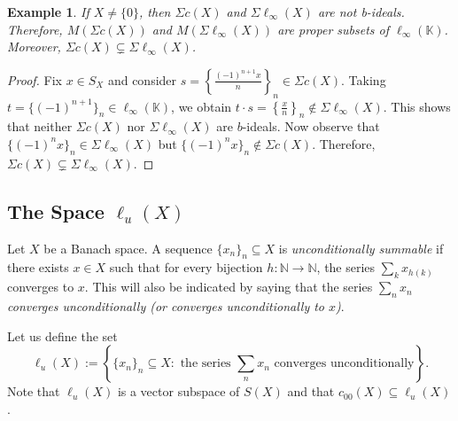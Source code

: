 \documentclass[14pt, a4paper]{article}  %
\providecommand{\pare}[1]{\left( #1\right) }
\newcommand{\K}{\mathbb{K}}
\newcommand{\N}{\mathbb{N}}
\newtheorem{example}{Example}[section]  %
\begin{document}
		\begin{example}\label{d333}
		If $X \neq \{0\}$, then  $\Sigma c\pare{X}$ and $\Sigma \ell_{\infty}\pare{X}$ are not b-ideals. Therefore,  $M(\Sigma c (X))$ and $M(\Sigma \ell_\infty (X))$ are proper subsets of $\ell_{\infty} (\K)$. Moreover, $\Sigma c\pare{X} \subsetneq \Sigma \ell_{\infty}\pare{X}$. 
	\end{example}
	\begin{proof}
		Fix $x \in S_{X}$ and consider $s = \left\{\frac{(-1)^{n+1}x}{n}\right\}_{n} \in \Sigma c\pare{X}$. Taking $t = \{(-1)^{n+1}\}_{n} \in \ell_{\infty}\pare{\K}$, we obtain $t \cdot s = \left\{\frac{x}{n}\right\}_{n} \notin \Sigma \ell_{\infty}\pare{X}$. This shows that neither $\Sigma c\pare{X}$ nor $\Sigma \ell_{\infty}\pare{X}$ are  $b$-ideals. Now observe that $\{(-1)^n x\}_{n} \in \Sigma \ell_{\infty}\pare{X}$ but $\{(-1)^n x\}_{n} \notin \Sigma c\pare{X}$. Therefore, $\Sigma c\pare{X} \subsetneq \Sigma \ell_{\infty}\pare{X}$.
	\end{proof}
	
	 
 
	 
	 \subsection{The Space  $\ell_{u}\pare{X}$ } 
Let $X$ be a Banach space. A sequence $\{x_{n}\}_{n}\subseteq X$ is \emph{unconditionally summable} if there exists $x\in X$ such that for every bijection $h:\N\to \N$, the series 
$\sum_{k}x_{h(k)}$ converges to $x$. This will also be indicated by saying that the series $\sum_{n}x_{n}$ \emph{converges unconditionally (or converges unconditionally to $x$)}. 

Let us define the set
\begin{equation}
	\ell_{u}(X):=\left\{\{x_{n}\}_{n}\subseteq X:\text{ the series }\sum_{n}x_{n}\text{ converges unconditionally}\right\}.
\end{equation}
Note that $\ell_{u}(X)$ is a vector subspace of $S\pare{X}$ and that $c_{00}\pare{X}\subseteq \ell_{u}\pare{X}$.
\end{document}
